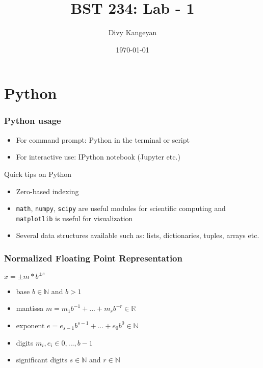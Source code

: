 \documentclass{beamer}
\title[BST 234]{BST 234: Lab - 1}
\author[Divy Kangeyan]{Divy Kangeyan}
\date{\today}
\begin{document}
	
	\begin{frame}
		\titlepage
	\end{frame}
	
	
\section{Python}

\begin{frame}
\frametitle{Python usage}

\begin{itemize}
\item For command prompt: Python in the terminal or script
\item For interactive use: IPython notebook (Jupyter etc.)
\end{itemize}

Quick tips on Python

\begin{itemize}
\item Zero-based indexing
\item \texttt{math}, \texttt{numpy}, \texttt{scipy} are useful modules for scientific computing and \texttt{matplotlib} is useful for visualization
\item Several data structures available such as: lists, dictionaries, tuples, arrays etc. 
\end{itemize}


\begin{center}
\small

\normalsize
\end{center}

\begin{center}
\end{center}


\end{frame}


\begin{frame}
\frametitle{Normalized Floating Point Representation}

\begin{center}
$x = \pm m * b^{\pm e}$
\end{center}

\begin{itemize}
\item base $b \in \mathbb{N}$ and $b > 1$
\item mantissa $m = m_1b^{-1}+...+m_rb^{-r} \in \mathbb{R}$
\item exponent $e = e_{s-1}b^{s-1}+...+e_0b^0 \in \mathbb{N}$
\item digits $m_i, e_i \in 0,...,b-1$
\item significant digits $s \in \mathbb{N}$ and $r \in \mathbb{N}$
\end{itemize}

\end{frame}
\end{document}
